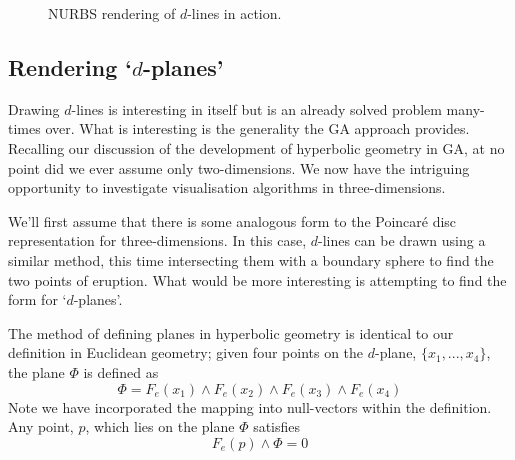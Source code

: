 \begin{figure} \centering
{}
\caption{NURBS rendering of $d$-lines in action.}
\label{fig:hyp1}
\end{figure}

\subsection{Rendering `$d$-planes'}


Drawing $d$-lines is interesting in itself but is an already solved 
problem many-times over. What is interesting is the generality the GA
approach provides. Recalling our discussion of the development of
hyperbolic geometry in GA, at no point did we ever assume only 
two-dimensions. We now have the intriguing opportunity to investigate
visualisation algorithms in three-dimensions.

We'll first assume that there is some analogous form to the Poincar\'e
disc representation for three-dimensions. In this case, $d$-lines can
be drawn using a similar method, this time intersecting them with a 
boundary sphere to find the two points of eruption. What would be 
more interesting is attempting to find the form for `$d$-planes'.

The method of defining planes in hyperbolic geometry is identical
to our definition in Euclidean geometry; given four points on the
$d$-plane, $\{ x_1, ..., x_4 \}$, the plane $\Phi$ is defined as
\begin{equation}
\Phi = F_e(x_1) \wedge F_e(x_2) \wedge F_e(x_3) \wedge   F_e(x_4) 
\label{eqn:plane}
\end{equation}
Note we have incorporated the mapping into null-vectors within
the definition. Any point, $p$, which lies on the plane $\Phi$ satisfies
\[
F_e(p) \wedge \Phi = 0
\]


